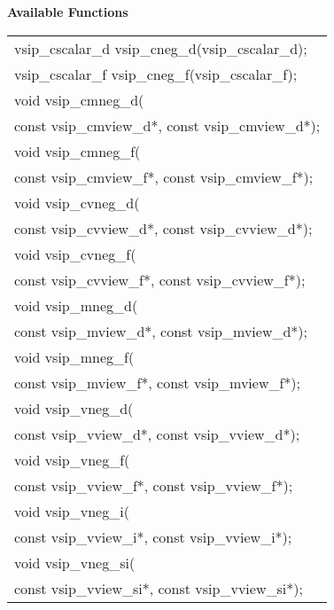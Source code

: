 \\\cvsiplh
\\ \hspace*{.8cm} \vspace*{.1cm} \textbf{Available Functions }
\\ \hspace*{1.1cm} {
\ttfamily
\begin{tabular}[H]{l}
vsip\_cscalar\_d vsip\_cneg\_d(vsip\_cscalar\_d);\\
vsip\_cscalar\_f vsip\_cneg\_f(vsip\_cscalar\_f);\\
void vsip\_cmneg\_d(\\*\hspace{.6cm}const vsip\_cmview\_d*, const vsip\_cmview\_d*);\\
void vsip\_cmneg\_f(\\*\hspace{.6cm}const vsip\_cmview\_f*, const vsip\_cmview\_f*);\\
void vsip\_cvneg\_d(\\*\hspace{.6cm}const vsip\_cvview\_d*, const vsip\_cvview\_d*);\\
void vsip\_cvneg\_f(\\*\hspace{.6cm}const vsip\_cvview\_f*, const vsip\_cvview\_f*);\\
void vsip\_mneg\_d(\\*\hspace{.6cm}const vsip\_mview\_d*, const vsip\_mview\_d*);\\
void vsip\_mneg\_f(\\*\hspace{.6cm}const vsip\_mview\_f*, const vsip\_mview\_f*);\\
void vsip\_vneg\_d(\\*\hspace{.6cm}const vsip\_vview\_d*, const vsip\_vview\_d*);\\
void vsip\_vneg\_f(\\*\hspace{.6cm}const vsip\_vview\_f*, const vsip\_vview\_f*);\\
void vsip\_vneg\_i(\\*\hspace{.6cm}const vsip\_vview\_i*, const vsip\_vview\_i*);\\
void vsip\_vneg\_si(\\*\hspace{.6cm}const vsip\_vview\_si*, const vsip\_vview\_si*);\\
\end{tabular}
}
\\\pyjvsiph